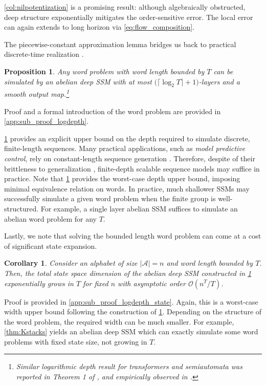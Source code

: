 \documentclass{article}
\theoremstyle{plain}
\newtheorem{proposition}[theorem]{Proposition}
\newtheorem{corollary}[theorem]{Corollary}
\theoremstyle{definition}
\theoremstyle{remark}
\newcommand{\mcal}[1]{\mathcal{#1}}
\begin{document}
\cref{col:nilpotentization} is a promising result: although algebraically obstructed,
deep structure exponentially mitigates the order-sensitive error.
The local error can again extends to long horizon via \cref{eq:flow_composition}.

The piecewise-constant approximation lemma bridges us back to
practical discrete-time realization \cite{krener1977decomposition}.
\begin{proposition}
\label{col:logdepth}
    Any word problem with word length bounded by $T$
    can be simulated by an
    abelian deep SSM with at most $\bigl(\lceil \log_2T \rceil + 1\bigr)$-layers and a smooth output map.\footnote{
Similar logarithmic depth result for transformers and semiautomata was reported in Theorem 1 of \citet{liu2022transformers},
and empirically observed in \citet{hu2024limitation}.
}
\end{proposition}
Proof and a formal introduction of the word problem are provided in \cref{app:sub_proof_logdepth}.

\cref{col:logdepth} provides an explicit upper bound on the depth required to simulate discrete, finite-length sequences.
Many practical applications, such as \emph{model predictive control},
rely on constant-length sequence generation \cite{hafner2019learning}.
Therefore, despite of their brittleness to generalization \cite{liu2022transformers},
finite-depth scalable sequence models may suffice in practice.
Note that \cref{col:logdepth} provides the worst-case depth upper bound, imposing minimal equivalence relation on words. In practice, much shallower SSMs may successfully simulate a given word problem when the finite group is well-structured.
For example, a single layer abelian SSM suffices to simulate an abelian word problem for any $T$.

Lastly, we note that solving the bounded length word problem can come at a cost of significant state expansion.
\begin{corollary}
\label{col:logdepth_state}
Consider an alphabet of size
$|\mcal{A}| = n$ and word length bounded by $T$.
Then, the total state space dimension of the abelian deep SSM constructed in \cref{col:logdepth} exponentially grows in $T$ for fixed $n$ with asymptotic order $\mcal{O}(n^T/T)$.
\end{corollary}
Proof is provided in \cref{app:sub_proof_logdepth_state}. Again, this is a worst-case width upper bound following the construction of \cref{col:logdepth}.
Depending on the structure of the word problem, the required width can be much smaller.
For example, \cref{thm:Kstacks} yields an abelian deep SSM which can exactly simulate some word problems with fixed state size, not growing in $T$.
\end{document}
